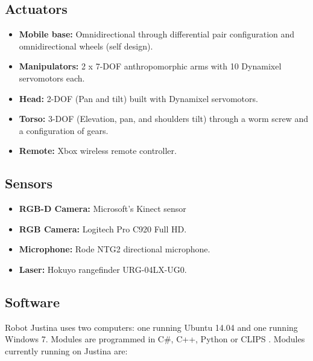 \documentclass{llncs}
\begin{document}
\subsection{Actuators}

\begin{itemize}
	\item \textbf{Mobile base:} Omnidirectional through differential pair configuration and omnidirectional wheels (self design). 
	\item \textbf{Manipulators:} 2 x 7-DOF anthropomorphic arms with 10 Dynamixel servomotors each.
	\item \textbf{Head:} 2-DOF (Pan and tilt) built with Dynamixel servomotors.
	\item \textbf{Torso:} 3-DOF (Elevation, pan, and shoulders tilt) through a worm screw and a configuration of gears. 
	\item \textbf{Remote:} Xbox wireless remote controller.
\end{itemize}

\subsection{Sensors}

\begin{itemize}
	\item \textbf{RGB-D Camera:} Microsoft's Kinect sensor 
	\item \textbf{RGB Camera:} Logitech Pro C920 Full HD.
	\item \textbf{Microphone:} Rode NTG2 directional microphone.
	\item \textbf{Laser:} Hokuyo rangefinder URG-04LX-UG0.
\end{itemize}

\subsection{Software}

Robot Justina uses two computers: one running Ubuntu 14.04 and one running Windows 7. Modules are programmed in C\#, C++, Python or CLIPS \cite{clips}. Modules currently running on Justina are:
\end{document}
